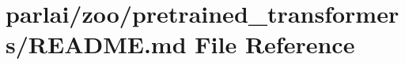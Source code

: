 \hypertarget{parlai_2zoo_2pretrained__transformers_2README_8md}{}\section{parlai/zoo/pretrained\+\_\+transformers/\+R\+E\+A\+D\+ME.md File Reference}
\label{parlai_2zoo_2pretrained__transformers_2README_8md}
